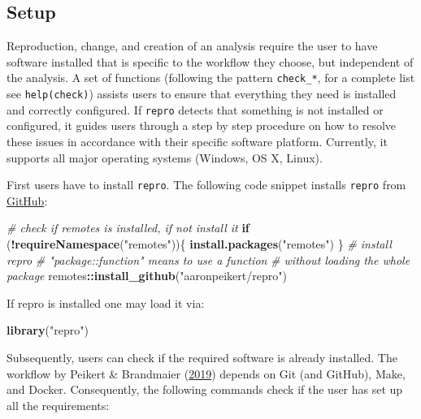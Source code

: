 \documentclass[12pt,a4paper,twoside]{article}
\newenvironment{Shaded}{\begin{snugshade}}{\end{snugshade}}
\newcommand{\CommentTok}[1]{\textcolor[rgb]{0.56,0.35,0.01}{\textit{#1}}}
\newcommand{\ControlFlowTok}[1]{\textcolor[rgb]{0.13,0.29,0.53}{\textbf{#1}}}
\newcommand{\KeywordTok}[1]{\textcolor[rgb]{0.13,0.29,0.53}{\textbf{#1}}}
\newcommand{\NormalTok}[1]{#1}
\newcommand{\OperatorTok}[1]{\textcolor[rgb]{0.81,0.36,0.00}{\textbf{#1}}}
\newcommand{\StringTok}[1]{\textcolor[rgb]{0.31,0.60,0.02}{#1}}
\begin{document}
\hypertarget{setup}{%
\subsection{Setup}\label{setup}}

Reproduction, change, and creation of an analysis require the user to have software installed that is specific to the workflow they choose, but independent of the analysis.
A set of functions (following the pattern \texttt{check\_*}, for a complete list see \texttt{help(check)}) assists users to ensure that everything they need is installed and correctly configured.
If \texttt{repro} detects that something is not installed or configured, it guides users through a step by step procedure on how to resolve these issues in accordance with their specific software platform.
Currently, it supports all major operating systems (Windows, OS X, Linux).

First users have to install \texttt{repro}. The following code snippet installs \texttt{repro} from \href{https://github.com/aaronpeikert/repro}{GitHub}:

\begin{Shaded}
\begin{Highlighting}[]
\CommentTok{# check if remotes is installed, if not install it}
\ControlFlowTok{if}\NormalTok{ (}\OperatorTok{!}\KeywordTok{requireNamespace}\NormalTok{(}\StringTok{"remotes"}\NormalTok{))\{}
  \KeywordTok{install.packages}\NormalTok{(}\StringTok{"remotes"}\NormalTok{)}
\NormalTok{\}}
\CommentTok{# install repro}
\CommentTok{# "package::function" means to use a function}
\CommentTok{# without loading the whole package}
\NormalTok{remotes}\OperatorTok{::}\KeywordTok{install_github}\NormalTok{(}\StringTok{"aaronpeikert/repro"}\NormalTok{)}
\end{Highlighting}
\end{Shaded}

If repro is installed one may load it via:

\begin{Shaded}
\begin{Highlighting}[]
\KeywordTok{library}\NormalTok{(}\StringTok{"repro"}\NormalTok{)}
\end{Highlighting}
\end{Shaded}

Subsequently, users can check if the required software is already installed.
The workflow by Peikert \& Brandmaier (\protect\hyperlink{ref-peikertReproducibleDataAnalysis2019}{2019}) depends on Git (and GitHub), Make, and Docker.
Consequently, the following commands check if the user has set up all the requirements:
\end{document}
